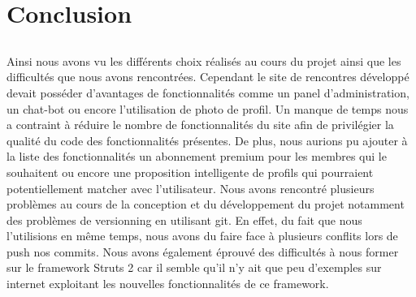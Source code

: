 \chapter{Conclusion}
\section*{}
Ainsi nous avons vu les différents choix réalisés au cours du projet ainsi que les difficultés que nous avons rencontrées.
Cependant le site de rencontres développé devait posséder d'avantages de fonctionnalités comme un panel d'administration, un chat-bot ou encore l'utilisation de photo de profil.
Un manque de temps nous a contraint à réduire le nombre de fonctionnalités du site afin de privilégier la qualité du code des fonctionnalités présentes.
De plus, nous aurions pu ajouter à la liste des fonctionnalités un abonnement premium pour les membres qui le souhaitent ou encore une proposition intelligente de profils qui pourraient potentiellement matcher avec l'utilisateur.
Nous avons rencontré plusieurs problèmes au cours de la conception et du développement du projet notamment des problèmes de versionning en utilisant git.
En effet, du fait que nous l'utilisions en même temps, nous avons du faire face à plusieurs conflits lors de push nos commits.
Nous avons également éprouvé des difficultés à nous former sur le framework Struts 2 car il semble qu'il n'y ait que peu d'exemples sur internet exploitant les nouvelles fonctionnalités de ce framework.
\section*{}

